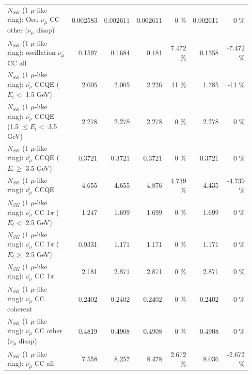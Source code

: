 \begin{table}
\begin{tabular}{| l | r | r | r  r | r  r |}
         $N_{SK}$ (1 $\mu$-like ring): Osc. $\nu_\mu$ CC other ($\nu_\mu$ disap) &        0.002583 &        0.002611 &        0.002611 &        0 \%  &        0.002611 &        0 \%  \\ 
                      $N_{SK}$ (1 $\mu$-like ring): oscillation $\nu_\mu$ CC all &          0.1597 &          0.1684 &           0.181 &    7.472 \%  &          0.1558 &   -7.472 \%  \\ 
\hline
\hline
          $N_{SK}$ (1 $\mu$-like ring): $\bar{\nu_\mu}$ CCQE ($E_{t} <$ 1.5 GeV) &           2.005 &           2.005 &           2.226 &       11 \%  &           1.785 &      -11 \%  \\ 
 $N_{SK}$ (1 $\mu$-like ring): $\bar{\nu_\mu}$ CCQE (1.5 $\leq E_{t} <$ 3.5 GeV) &           2.278 &           2.278 &           2.278 &        0 \%  &           2.278 &        0 \%  \\ 
       $N_{SK}$ (1 $\mu$-like ring): $\bar{\nu_\mu}$ CCQE ($E_{t} \geq$ 3.5 GeV) &          0.3721 &          0.3721 &          0.3721 &        0 \%  &          0.3721 &        0 \%  \\ 
\hline
                              $N_{SK}$ (1 $\mu$-like ring): $\bar{\nu_\mu}$ CCQE &           4.655 &           4.655 &           4.876 &    4.739 \%  &           4.435 &   -4.739 \%  \\ 
\hline
     $N_{SK}$ (1 $\mu$-like ring): $\bar{\nu_\mu}$ CC 1$\pi$ ($E_{t} <$ 2.5 GeV) &           1.247 &           1.699 &           1.699 &        0 \%  &           1.699 &        0 \%  \\ 
  $N_{SK}$ (1 $\mu$-like ring): $\bar{\nu_\mu}$ CC 1$\pi$ ($E_{t} \geq$ 2.5 GeV) &          0.9331 &           1.171 &           1.171 &        0 \%  &           1.171 &        0 \%  \\ 
\hline
                         $N_{SK}$ (1 $\mu$-like ring): $\bar{\nu_\mu}$ CC 1$\pi$ &           2.181 &           2.871 &           2.871 &        0 \%  &           2.871 &        0 \%  \\ 
                       $N_{SK}$ (1 $\mu$-like ring): $\bar{\nu_\mu}$ CC coherent &          0.2402 &          0.2402 &          0.2402 &        0 \%  &          0.2402 &        0 \%  \\ 
        $N_{SK}$ (1 $\mu$-like ring): $\bar{\nu_\mu}$ CC other ($\nu_\mu$ disap) &          0.4819 &          0.4908 &          0.4908 &        0 \%  &          0.4908 &        0 \%  \\ 
                          $N_{SK}$ (1 $\mu$-like ring): $\bar{\nu_{\mu}}$ CC all &           7.558 &           8.257 &           8.478 &    2.672 \%  &           8.036 &   -2.672 \%  \\ 

\end{tabular}
\end{table}
